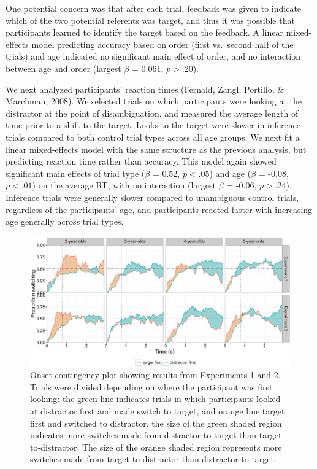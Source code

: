 \documentclass[a4paper,man,apacite,floatsintext]{apa6}
\newenvironment{CodeChunk}{}{}
\begin{document}
One potential concern was that after each trial, feedback was given to
indicate which of the two potential referents was target, and thus it
was possible that participants learned to identify the target based on
the feedback. A linear mixed-effects model predicting accuracy based on
order (first vs.~second half of the trials) and age indicated no
significant main effect of order, and no interaction between age and
order (largest \(\beta\) = 0.061, \(p >.20\)).

We next analyzed participants' reaction times (Fernald, Zangl, Portillo,
\& Marchman, 2008). We selected trials on which participants were
looking at the distractor at the point of disambiguation, and measured
the average length of time prior to a shift to the target. Looks to the
target were slower in inference trials compared to both control trial
types across all age groups. We next fit a linear mixed-effects model
with the same structure as the previous analysis, but predicting
reaction time rather than accuracy. This model again showed significant
main effects of trial type (\(\beta\) = 0.52, \(p <.05\)) and age
(\(\beta\) = -0.08, \(p <.01\)) on the average RT, with no interaction
(largest \(\beta\) = -0.06, \(p >.24\)). Inference trials were generally
slower compared to unambiguous control trials, regardless of the
participants' age, and participants reacted faster with increasing age
generally across trial types.

\begin{CodeChunk}
\begin{figure}[H]

{\centering \includegraphics{figs/et_ons-1} 

}

\caption[Onset contingency plot showing results from Experiments 1 and 2]{Onset contingency plot showing results from Experiments 1 and 2. Trials were divided depending on where the participant was first looking: the green line indicates trials in which participants looked at distractor first and made switch to target, and orange line target first and switched to distractor. the size of the green shaded region indicates more switches made from distractor-to-target than target-to-distractor. The size of the orange shaded region represents more switches made from target-to-distractor than distractor-to-target.}\label{fig:et_ons}
\end{figure}
\end{CodeChunk}
\end{document}
